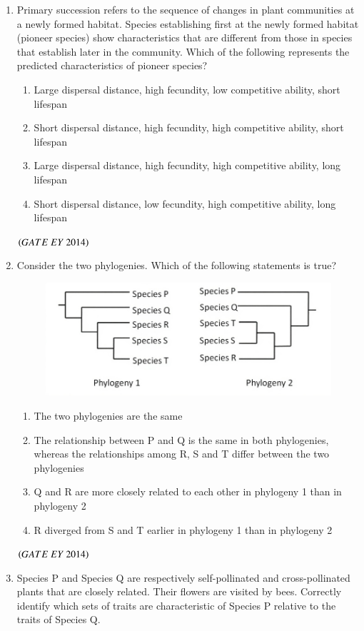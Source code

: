 \documentclass[journal]{IEEEtran}
\numberwithin{equation}{enumi}
\numberwithin{figure}{enumi}
\begin{document}
\begin{enumerate}
    \item Primary succession refers to the sequence of changes in plant communities at a newly formed habitat. Species establishing first at the newly formed habitat (pioneer species) show characteristics that are different from those in species that establish later in the community. Which of the following represents the predicted characteristics of pioneer species?
    \begin{enumerate}
        \item Large dispersal distance, high fecundity, low competitive ability, short lifespan
        \item Short dispersal distance, high fecundity, high competitive ability, short lifespan
        \item Large dispersal distance, high fecundity, high competitive ability, long lifespan
        \item Short dispersal distance, low fecundity, high competitive ability, long lifespan
    \end{enumerate}
    \hfill{$\brak{ GATE\ EY\ 2014}$}
    \bigskip
\newpage
    \item Consider the two phylogenies. Which of the following statements is true?
    \begin{figure}[H]
    \centering
    \includegraphics[width=0.7\columnwidth]{figs/19.png}
    \caption{}
    \label{fig:19}
   \end{figure}
   \begin{enumerate}
        \item The two phylogenies are the same
        \item The relationship between P and Q is the same in both phylogenies, whereas the relationships among R, S and T differ between the two phylogenies
        \item Q and R are more closely related to each other in phylogeny 1 than in phylogeny 2
        \item R diverged from S and T earlier in phylogeny 1 than in phylogeny 2
    \end{enumerate}
    \hfill{$\brak{ GATE\ EY\ 2014}$}
    \item Species P and Species Q are respectively self-pollinated and cross-pollinated plants that are closely related. Their flowers are visited by bees. Correctly identify which sets of traits are characteristic of Species P relative to the traits of Species Q.

\end{enumerate}
\end{document}
